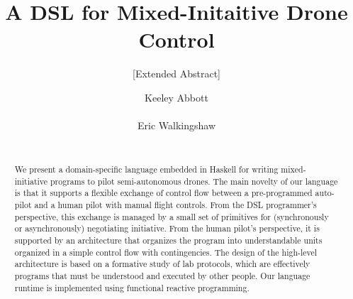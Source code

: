 \documentclass{sig-alternate-05-2015}
\begin{document}




\title{A DSL for Mixed-Initaitive Drone Control}
\subtitle{[Extended Abstract]}

\author{
\alignauthor
Keeley Abbott\\
\\
\alignauthor
Eric Walkingshaw\\
\\
}

\maketitle
\begin{abstract}
%
We present a domain-specific language embedded in Haskell for writing
mixed-initiative programs to pilot semi-autono\-mous drones. The main novelty of
our language is that it supports a flexible exchange of control flow between a
pre-programmed auto-pilot and a human pilot with manual flight controls. From
the DSL programmer's perspective, this exchange is managed by a small set of
primitives for (synchronously or asynchronously) negotiating initiative. From
the human pilot's perspective, it is supported by an architecture that
organizes the program into understandable units organized in a simple control
flow with contingencies. The design of the high-level architecture is based on
a formative study of lab protocols, which are effectively programs that must be
understood and executed by other people.
%
Our language runtime is implemented using functional reactive programming.
%
\end{abstract}
\end{document}
